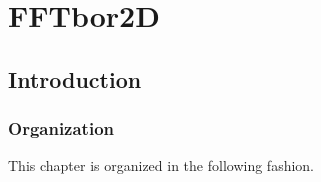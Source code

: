 
\chapter{FFTbor2D}
\label{ch:ffttwo}


\section{Introduction}
\label{sec:ffttwo:intro}

\subsection{Organization}
\label{subsec:ffttwo:org}

This chapter is organized in the following fashion.
